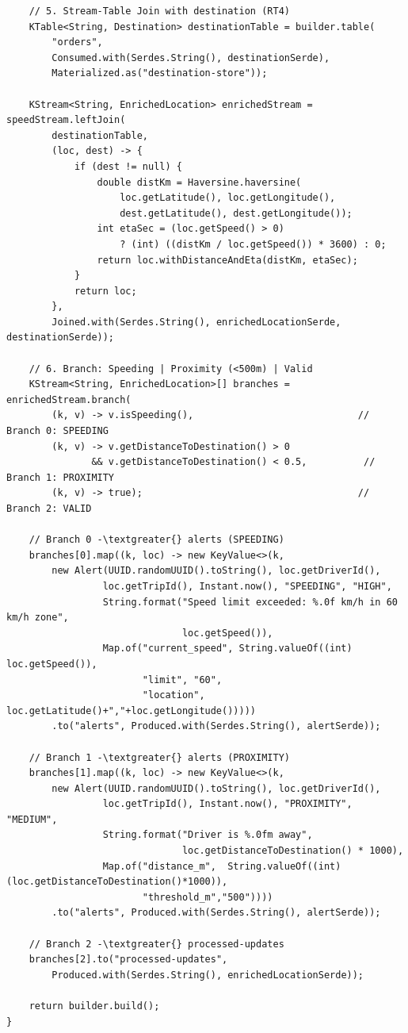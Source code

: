 \begin{lstlisting}
    // 5. Stream-Table Join with destination (RT4)
    KTable<String, Destination> destinationTable = builder.table(
        "orders",
        Consumed.with(Serdes.String(), destinationSerde),
        Materialized.as("destination-store"));

    KStream<String, EnrichedLocation> enrichedStream = speedStream.leftJoin(
        destinationTable,
        (loc, dest) -> {
            if (dest != null) {
                double distKm = Haversine.haversine(
                    loc.getLatitude(), loc.getLongitude(),
                    dest.getLatitude(), dest.getLongitude());
                int etaSec = (loc.getSpeed() > 0)
                    ? (int) ((distKm / loc.getSpeed()) * 3600) : 0;
                return loc.withDistanceAndEta(distKm, etaSec);
            }
            return loc;
        },
        Joined.with(Serdes.String(), enrichedLocationSerde, destinationSerde));

    // 6. Branch: Speeding | Proximity (<500m) | Valid
    KStream<String, EnrichedLocation>[] branches = enrichedStream.branch(
        (k, v) -> v.isSpeeding(),                             // Branch 0: SPEEDING
        (k, v) -> v.getDistanceToDestination() > 0
               && v.getDistanceToDestination() < 0.5,          // Branch 1: PROXIMITY
        (k, v) -> true);                                      // Branch 2: VALID

    // Branch 0 -\textgreater{} alerts (SPEEDING)
    branches[0].map((k, loc) -> new KeyValue<>(k,
        new Alert(UUID.randomUUID().toString(), loc.getDriverId(),
                 loc.getTripId(), Instant.now(), "SPEEDING", "HIGH",
                 String.format("Speed limit exceeded: %.0f km/h in 60 km/h zone",
                               loc.getSpeed()),
                 Map.of("current_speed", String.valueOf((int) loc.getSpeed()),
                        "limit", "60",
                        "location", loc.getLatitude()+","+loc.getLongitude()))))
        .to("alerts", Produced.with(Serdes.String(), alertSerde));

    // Branch 1 -\textgreater{} alerts (PROXIMITY)
    branches[1].map((k, loc) -> new KeyValue<>(k,
        new Alert(UUID.randomUUID().toString(), loc.getDriverId(),
                 loc.getTripId(), Instant.now(), "PROXIMITY", "MEDIUM",
                 String.format("Driver is %.0fm away",
                               loc.getDistanceToDestination() * 1000),
                 Map.of("distance_m",  String.valueOf((int)(loc.getDistanceToDestination()*1000)),
                        "threshold_m","500"))))
        .to("alerts", Produced.with(Serdes.String(), alertSerde));

    // Branch 2 -\textgreater{} processed-updates
    branches[2].to("processed-updates",
        Produced.with(Serdes.String(), enrichedLocationSerde));

    return builder.build();
}
\end{lstlisting}

